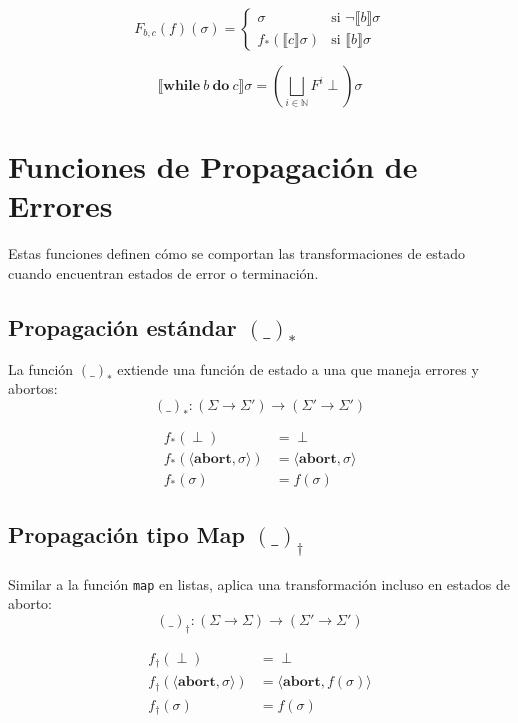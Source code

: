 \documentclass[a4paper,11pt]{article}
\begin{document}
\[
F_{b,c}(f)(\sigma) =
\begin{cases}
    \sigma & \text{si } \neg \llbracket b \rrbracket \sigma \\
    f_{*} (\llbracket c \rrbracket \sigma) & \text{si } \llbracket b \rrbracket \sigma
\end{cases}
\]

\[
\llbracket \mathbf{while} \ b \ \mathbf{do} \ c \rrbracket \sigma =
\left( \bigsqcup_{i \in \mathbb{N}} F^i \perp \right) \sigma
\]

\section{Funciones de Propagación de Errores}

Estas funciones definen cómo se comportan las transformaciones de estado cuando encuentran estados de error o terminación.

\subsection{Propagación estándar $(\_)_{*}$}

La función $(\_)_{*}$ extiende una función de estado a una que maneja errores y abortos:
\[
(\_)_{*} : (\Sigma \to \Sigma') \to (\Sigma' \to \Sigma')
\]

\[
\begin{aligned}
f_{*}(\perp) &= \perp \\
f_{*}(\langle \mathbf{abort}, \sigma \rangle) &= \langle \mathbf{abort}, \sigma \rangle \\
f_{*}(\sigma) &= f(\sigma)
\end{aligned}
\]

\subsection{Propagación tipo Map $(\_)_{\dagger}$}

Similar a la función \texttt{map} en listas, aplica una transformación incluso en estados de aborto:
\[
(\_)_{\dagger} : (\Sigma \to \Sigma) \to (\Sigma' \to \Sigma')
\]

\[
\begin{aligned}
f_{\dagger}(\perp) &= \perp \\
f_{\dagger}(\langle \mathbf{abort}, \sigma \rangle) &= \langle \mathbf{abort}, f(\sigma) \rangle \\
f_{\dagger}(\sigma) &= f(\sigma)
\end{aligned}
\]
\end{document}
